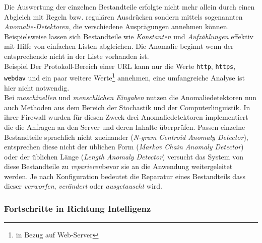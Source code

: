 
Die Auswertung der einzelnen Bestandteile erfolgte nicht mehr allein durch einen Abgleich mit Regeln bzw. regulären Ausdrücken sondern mittels sogenannten \emph{Anomalie-Detektoren}, die verschiedene Ausprägungen annehmen können. Beispielsweise lassen sich Bestandteile wie \emph{Konstanten} und \emph{Aufzählungen} effektiv mit Hilfe von einfachen Listen abgleichen. Die Anomalie beginnt wenn der entsprechende nicht in der Liste vorhanden ist.\\

\textcolor{bhtGray}{ Beispiel} Der Protokoll-Bereich einer URL kann nur die Werte \verb=http=, \verb=https=, \verb=webdav= und ein paar weitere Werte\footnote{in Bezug auf Web-Server} annehmen, eine umfangreiche Analyse ist hier nicht notwendig. \\

Bei \emph{maschinellen} und \emph{menschlichen Eingaben} nutzen die Anomaliedetektoren nun auch Methoden aus dem Bereich der Stochastik und der Computerlinguistik. In ihrer Firewall wurden für diesen Zweck drei Anomaliedetektoren implementiert die die Anfragen an den Server und deren Inhalte überprüfen. Passen einzelne Bestandteile sprachlich nicht zueinander (\emph{N-gram Centroid Anomaly Detector}), entsprechen diese nicht der üblichen Form (\emph{Markov Chain Anomaly Detector}) oder der üblichen Länge (\emph{Length Anomaly Detector}) versucht das System von~\cite{Krueger2010} diese Bestandteile zu \glqq\emph{reparieren}\grqq bevor sie an die Anwendung weitergeleitet werden. Je nach Konfiguration bedeutet die Reparatur eines Bestandteils dass dieser \emph{verworfen}, \emph{verändert} oder \emph{ausgetauscht} wird. 






\subsubsection{Fortschritte in Richtung Intelligenz}

